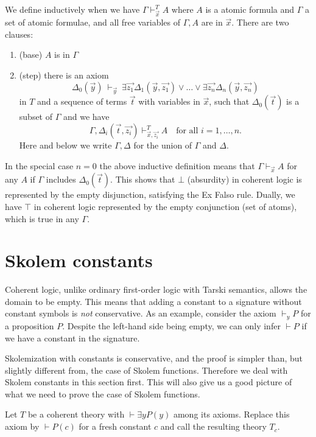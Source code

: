 \documentclass{fundam}
\begin{document}
We define inductively when we have $\Gamma\vdash_{\vec{x}}^T A$ 
where $A$ is a atomic formula and $\Gamma$ a set of atomic formulae,
and all free variables of $\Gamma,A$ are in $\vec{x}$. There are two clauses:

\begin{enumerate}
\item (base) $A$ is in $\Gamma$ 

\item (step) there is an axiom 
$$
\Delta_0(\vec{y})~\vdash_{\vec{y}}~
\exists \vec{z_1}\Delta_1(\vec{y},\vec{z_1})\vee\dots\vee\exists \vec{z_n}\Delta_n(\vec{y},\vec{z_n})
$$
in $T$ and a sequence of terms $\vec{t}$ with variables in $\vec{x}$,
such that $\Delta_0(\vec{t})$ is a subset of $\Gamma$ and
we have 
$$
\Gamma,\Delta_i(\vec{t},\vec{z_i})\vdash^T_{\vec{x},\vec{z_i}} A
\quad \text{for all $i = 1,\dots,n$.}
$$
Here and below we write $\Gamma,\Delta$ for the union of $\Gamma$ and $\Delta$.
\end{enumerate}

In the special case $n=0$ the above inductive definition
means that $\Gamma\vdash_{\vec{x}} A$ for any $A$ if $\Gamma$
includes $\Delta_0(\vec{t})$. This shows that $\bot$ (absurdity) in coherent logic
is represented by the empty disjunction, satisfying the Ex Falso rule. Dually, we have $\top$
in coherent logic represented by  the empty conjunction (set of atoms), 
which is true in any $\Gamma$.

\section{Skolem constants}\label{sec:skolemconstant}

Coherent logic, unlike ordinary first-order logic with Tarski semantics,
allows the domain to be empty. This means that adding a constant to a signature
without constant symbols is \emph{not} conservative.
As an example, consider the axiom $\vdash_{y} P$ for a proposition $P$.
Despite the left-hand side being empty,
we can only infer $\vdash P$ if we have a constant in the signature.

Skolemization with constants is conservative, and the proof is simpler than,
but slightly different from, the case of Skolem functions.
Therefore we deal with Skolem constants in this section first.
This will also give us a good picture of what we need to prove
the case of Skolem functions.

Let $T$ be a coherent theory with $\vdash\exists y P(y)$ among its axioms.
Replace this axiom by $\vdash P(c)$ for a fresh constant $c$
and call the resulting theory $T_c$. 
\end{document}

